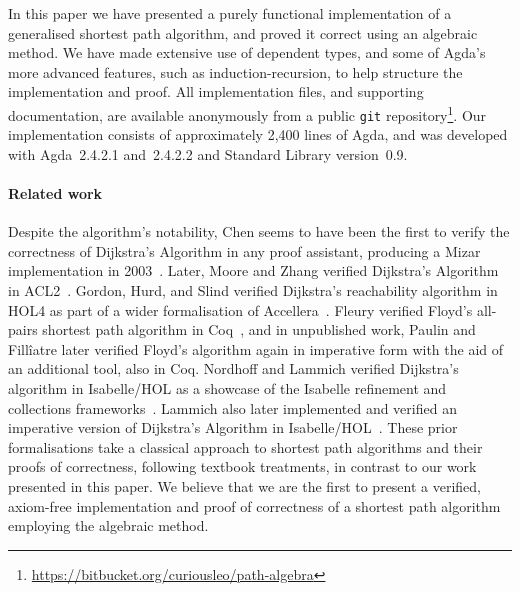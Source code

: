 In this paper we have presented a purely functional implementation of a generalised shortest path algorithm, and proved it correct using an algebraic method.
We have made extensive use of dependent types, and some of Agda's more advanced features, such as induction-recursion, to help structure the implementation and proof.
All implementation files, and supporting documentation, are available anonymously from a public \texttt{git} repository\footnote{\url{https://bitbucket.org/curiousleo/path-algebra}}.
Our implementation consists of approximately 2,400 lines of Agda, and was developed with Agda~2.4.2.1 and~2.4.2.2 and Standard Library version~0.9.

\paragraph{Related work} Despite the algorithm's notability, Chen seems to have been the first to verify the correctness of Dijkstra's Algorithm in any proof assistant, producing a Mizar implementation in 2003~\cite{chen:dijkstra:2003}.
Later, Moore and Zhang verified Dijkstra's Algorithm in ACL2~\cite{moore:proof-pearl:2005}.
Gordon, Hurd, and Slind verified Dijkstra's reachability algorithm in HOL4 as part of a wider formalisation of Accellera~\cite{gordon:executing:2003}.
Fleury verified Floyd's all-pairs shortest path algorithm in Coq~\cite{fleury:implantation:1990}, and in unpublished work, Paulin and Fill\^iatre later verified Floyd's algorithm again in imperative form with the aid of an additional tool, also in Coq.
Nordhoff and Lammich verified Dijkstra's algorithm in Isabelle/HOL as a showcase of the Isabelle refinement and collections frameworks~\cite{nordhoff-dijkstra-2012}.
Lammich also later implemented and verified an imperative version of Dijkstra's Algorithm in Isabelle/HOL~\cite{lammich:refinement:2015}.
These prior formalisations take a classical approach to shortest path algorithms and their proofs of correctness, following textbook treatments, in contrast to our work presented in this paper.
We believe that we are the first to present a verified, axiom-free implementation and proof of correctness of a shortest path algorithm employing the algebraic method.

